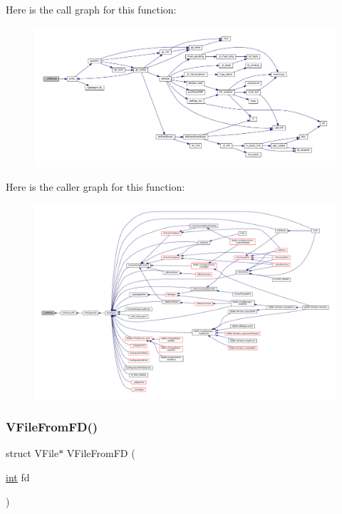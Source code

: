 Here is the call graph for this function\+:
\nopagebreak
\begin{figure}[H]
\begin{center}
\leavevmode
\includegraphics[width=350pt]{vfs-fd_8c_a9f8dcc1c16660034ac0746b80f9c0c21_cgraph}
\end{center}
\end{figure}
Here is the caller graph for this function\+:
\nopagebreak
\begin{figure}[H]
\begin{center}
\leavevmode
\includegraphics[width=350pt]{vfs-fd_8c_a9f8dcc1c16660034ac0746b80f9c0c21_icgraph}
\end{center}
\end{figure}
\mbox{\label{vfs-fd_8c_aae510cbd565bd600f316891c3fdfd222}} 
\subsubsection{\texorpdfstring{V\+File\+From\+F\+D()}{VFileFromFD()}}
{\footnotesize\ttfamily struct V\+File$\ast$ V\+File\+From\+FD (\begin{DoxyParamCaption}\item[{\mbox{\hyperlink{ioapi_8h_a787fa3cf048117ba7123753c1e74fcd6}{int}}}]{fd }\end{DoxyParamCaption})}

